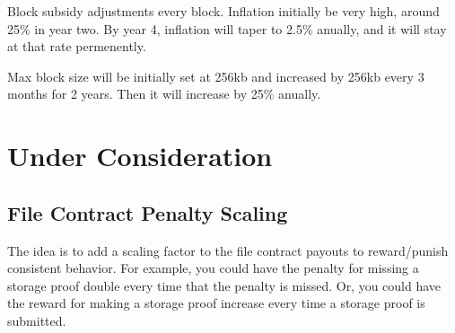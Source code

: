 \documentclass[twocolumn]{article}
\begin{document}
Block subsidy adjustments every block.
Inflation initially be very high, around 25\% in year two.
By year 4, inflation will taper to 2.5\% anually, and it will stay at that rate permenently.

Max block size will be initially set at 256kb and increased by 256kb every 3 months for 2 years.
Then it will increase by 25\% anually.



\section{Under Consideration}
\subsection{File Contract Penalty Scaling}
The idea is to add a scaling factor to the file contract payouts to reward/punish consistent behavior.
For example, you could have the penalty for missing a storage proof double every time that the penalty is missed.
Or, you could have the reward for making a storage proof increase every time a storage proof is submitted.
\end{document}
